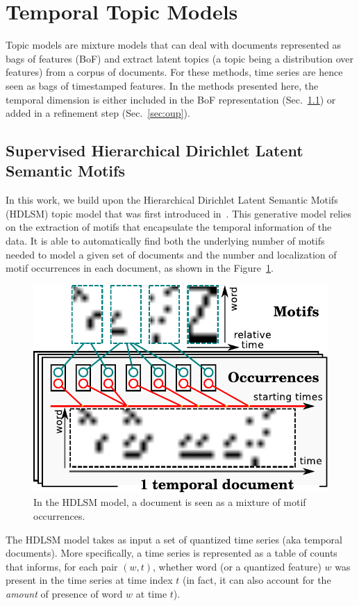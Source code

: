 \section{Temporal Topic Models}
\label{sec:topics}

Topic models are mixture models that can deal with documents represented as
bags of features (BoF) and extract latent topics (a topic being a distribution
over features) from a corpus of documents.
For these methods, time series are hence seen as bags of timestamped features.
In the methods presented here, the temporal dimension is either
included in the BoF representation (Sec.~\ref{sec:hdlsm}) or added in a
refinement step (Sec.~\ref{sec:oup}).

\subsection{Supervised Hierarchical Dirichlet Latent Semantic Motifs}
\label{sec:hdlsm}

In this work, we build upon the Hierarchical Dirichlet Latent Semantic Motifs
(HDLSM) topic model that was first introduced in~\cite{EmonetCVPR2011}.
This generative model relies on the extraction of motifs that encapsulate the
temporal information of the data.
It is able to automatically find both the underlying number of motifs needed to
model a given set of documents and the number and localization of motif
occurrences in each document, as shown in the Figure~\ref{fig:hdlsm}.

\begin{figure}
\centering
\includegraphics[width=.4\textwidth]{fig/hdlsm}
\caption{In the HDLSM model, a document is seen as a mixture of motif
occurrences. \label{fig:hdlsm}}
\end{figure}

The HDLSM model takes as input a set of quantized time series (aka temporal
documents).
More specifically, a time series is represented as a table of counts that
informs, for
each pair $(w, t)$, whether word (or a quantized feature) $w$ was
present in the time series at time index $t$ (in fact, it can also account for
the \emph{amount} of presence of word $w$ at time $t$).

